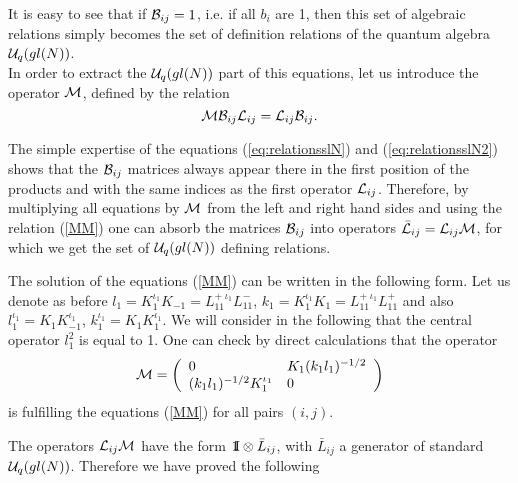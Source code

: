 \documentclass[a4paper,a4paper]{article}
\def\cM{{\cal M}}          \def\cN{{\cal N}}          \def\cO{{\cal O}}
\newcommand{\un}{\mbox{1\hspace{-1mm}I}}
\newcommand{\nn}{\nonumber}
\begin{document}
It is easy to see that if  ${\cal B}_{ij}= 1$, i.e. if all $b_i$ are 1, 
then this 
set of algebraic relations simply becomes the set of definition
relations of the  quantum algebra ${\cal U}_q(gl(N))$.
\\
In order to extract the ${\cal U}_q(gl(N))$ part of this equations, let us
introduce the operator $\cM$, defined by the relation
\begin{equation}
  \label{MM}
\cM \cB_{ij} \cL_{ij} =\cL_{ij}\cB_{ij}.        
\end{equation}  

The simple expertise of the equations (\ref{eq:relationsslN})
and (\ref{eq:relationsslN2}) shows that the ${\cal B}_{ij}$
matrices always appear there in the first position of 
the products and with the
same indices as the first operator ${\cal L}_{ij}$. Therefore, by 
multiplying all equations by $\cM$ from the left and right hand
sides and using the relation (\ref{MM}) one can absorb the 
matrices ${\cal B}_{ij}$ into operators 
$\bar{\cL}_{ij}= \cL_{ij} \cM$, for which we get the set
of ${\cal U}_q(gl(N))$ defining relations.

The solution of the equations (\ref{MM}) can be written in the following
form. Let us denote as before $l_1=K_1^{\iota_1} K_{-1}=
L_{11}^{+\;\iota_1}L_{11}^{-}$, 
$k_1=K_1^{\iota_1} K_{1}=L_{11}^{+\;\iota_1}L_{11}^{+}$ and also 
$l_1^{\iota_1}=K_1 K_{-1}^{\iota_1}$, $k_1^{\iota_1}=K_1 K_{1}^{\iota_1}$.
We will consider in the following that the central operator $l_1^2$ is equal 
to 1.
One can check by direct calculations that the operator
\begin{eqnarray}
  \label{1MM}
  \cM = \left( \begin{array}{ll}
      0 & K_1 ({k_1}{l_1})^{-1/2}\nn\\
      ({k_1}{l_1})^{-1/2} K_1^{\iota_1}& 0
    \end{array}
  \right)
\end{eqnarray}
is fulfilling the equations (\ref{MM}) for all pairs $(i,j)$.

The operators $\cL_{ij} \cM$ have the form 
$\un \otimes \bar L_{ij}$, with $\bar L_{ij}$ a generator of standard 
${\cal U}_q(gl(N))$.
Therefore we have proved the following
\end{document}
